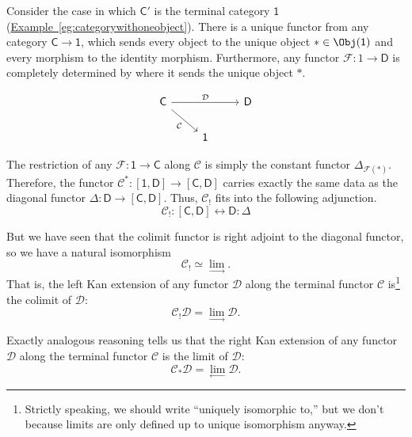 \documentclass[main.tex]{subfiles}
\begin{document}
Consider the case in which $\mathsf{C}'$ is the terminal category $\mathsf{1}$ (\hyperref[eg:categorywithoneobject]{Example~\ref*{eg:categorywithoneobject}}). There is a unique functor from any category $\mathsf{C} \to \mathsf{1}$, which sends every object to the unique object $* \in \Obj(\mathsf{1})$ and every morphism to the identity morphism. Furthermore, any functor $\mathcal{F}\colon 1 \to \mathsf{D}$ is completely determined by where it sends the unique object $*$.

\begin{equation*}
  \begin{tikzcd}
    \mathsf{C}
    \arrow[rr, "\mathcal{D}"]
    \arrow[dr, swap, "\mathcal{C}"]
    && \mathsf{D}
    \\
    & \mathsf{1}
  \end{tikzcd}
\end{equation*}

The restriction of any $\mathcal{F}\colon \mathsf{1} \to \mathsf{C}$ along $\mathcal{C}$ is simply the constant functor $\Delta_{\mathcal{F}(*)}$. Therefore, the functor $\mathcal{C}^{*}\colon [\mathsf{1},\mathsf{D}] \to [\mathsf{C}, \mathsf{D}]$ carries exactly the same data as the diagonal functor $\Delta\colon \mathsf{D} \to [\mathsf{C},\mathsf{D}]$. Thus, $\mathcal{C}_{!}$ fits into the following adjunction.
\begin{equation*}
  \mathcal{C}_{!} : [\mathsf{C}, \mathsf{D}] \leftrightarrow \mathsf{D} : \Delta
\end{equation*}

But we have seen that the colimit functor is right adjoint to the diagonal functor, so we have a natural isomorphism
\begin{equation*}
  \mathcal{C}_{!} \simeq \lim_{\rightarrow}.
\end{equation*}
That is, the left Kan extension of any functor $\mathcal{D}$ along the terminal functor $\mathcal{C}$ is\footnote{Strictly speaking, we should write ``uniquely isomorphic to,'' but we don't because limits are only defined up to unique isomorphism anyway.} the colimit of $\mathcal{D}$:
\begin{equation*}
  \mathcal{C}_{!}\mathcal{D} = \lim_{\rightarrow} \mathcal{D}.
\end{equation*}

Exactly analogous reasoning tells us that the right Kan extension of any functor $\mathcal{D}$ along the terminal functor $\mathcal{C}$ is the limit of $\mathcal{D}$:
\begin{equation*}
  \mathcal{C}_{*}\mathcal{D} = \lim_{\leftarrow} \mathcal{D}.
\end{equation*}
\end{document}
